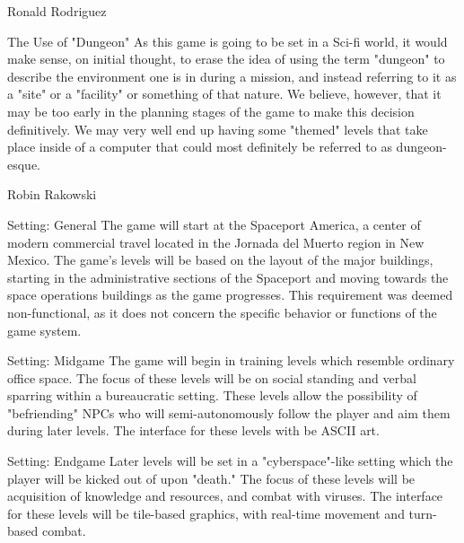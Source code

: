 \documentclass[12pt]{report}
\begin{document}
\begin{section}{Ronald Rodriguez}
\begin{subsection}{The Use of "Dungeon"}
As this game is going to be set in a Sci-fi world, it would make sense, on 
initial thought, to erase the idea of using the term "dungeon" to describe 
the environment one is in during a mission, and instead referring to it as 
a "site" or a "facility" or something of that nature. We believe, however, 
that it may be too early in the planning stages of the game to make this 
decision definitively. We may very well end up having some "themed" levels 
that take place inside of a computer that could most definitely be referred 
to as dungeon-esque. 

\begin{section}{Robin Rakowski}

\begin{subsection}{Setting: General}
The game will start at the Spaceport America, a center of modern commercial travel located in the Jornada del Muerto region in New Mexico. The game's levels will be based on the layout of the major buildings, starting in the administrative sections of the Spaceport and moving towards the space operations buildings as the game progresses. This requirement was deemed non-functional, as it does not concern the specific behavior or functions of the game system.
\end{subsection}

\begin{subsection}{Setting: Midgame}
The game will begin in training levels which resemble ordinary office space. The focus of these levels will be on social standing and verbal sparring within a bureaucratic setting. These levels allow the possibility of "befriending" NPCs who will semi-autonomously follow the player and aim them during later levels. The interface for these levels with be ASCII art.
\end{subsection}

\begin{subsection}{Setting: Endgame}
Later levels will be set in a "cyberspace"-like setting which the player will be kicked out of upon "death." The focus of these levels will be acquisition of knowledge and resources, and combat with viruses. The interface for these levels will be tile-based graphics, with real-time movement and turn-based combat.
\end{subsection}


\end{section}




\end{subsection}
\end{section}
\end{document}
